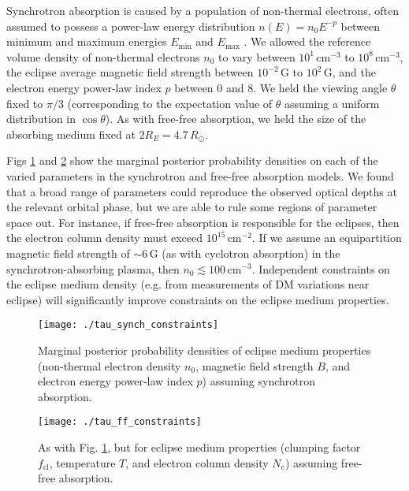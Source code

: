 \documentclass[fleqn,usenatbib]{mnras}
\begin{document}
Synchrotron absorption is caused by a population of non-thermal electrons, often assumed to possess a power-law energy distribution $n(E) = n_0 E^{-p}$ between minimum and maximum energies $E_\text{min}$ and $E_\text{max}$ \citep{1994ApJ...422..304T}. We allowed the reference volume density of non-thermal electrons $n_0$ to vary between $10^1\,\text{cm}^{-3}$ to $10^{8}\,\text{cm}^{-3}$, the eclipse average magnetic field strength between $10^{-2}$\,G to $10^2$\,G, and the electron energy power-law index $p$ between 0 and 8. We held the viewing angle $\theta$ fixed to $\pi/3$ (corresponding to the expectation value of $\theta$ assuming a uniform distribution in $\cos \theta$). As with free-free absorption, we held the size of the absorbing medium fixed at $2R_E = 4.7\,R_\odot$.

Figs \ref{fig:tau_synch} and \ref{fig:tau_ff} show the marginal posterior probability densities on each of the varied parameters in the synchrotron and free-free absorption models. We found that a broad range of parameters could reproduce the observed optical depths at the relevant orbital phase, but we are able to rule some regions of parameter space out. For instance, if free-free absorption is responsible for the eclipses, then the electron column density must exceed $10^{15}$\,cm$^{-2}$. If we assume an equipartition magnetic field strength of $\sim 6$\,G (as with cyclotron absorption) in the synchrotron-absorbing plasma, then $n_0 \lesssim 100$\,cm$^{-3}$. Independent constraints on the eclipse medium density (e.g. from measurements of DM variations near eclipse) will significantly improve constraints on the eclipse medium properties.

\begin{figure}
    \texttt{[image: ./tau\_synch\_constraints]}
    \caption{Marginal posterior probability densities of eclipse medium properties (non-thermal electron density $n_0$, magnetic field strength $B$, and electron energy power-law index $p$) assuming synchrotron absorption. \label{fig:tau_synch}}
\end{figure}

\begin{figure}
    \texttt{[image: ./tau\_ff\_constraints]}
    \caption{As with Fig. \ref{fig:tau_synch}, but for eclipse medium properties (clumping factor $f_{\mathrm{cl}}$, temperature $T$, and electron column density $N_e$) assuming free-free absorption. \label{fig:tau_ff}}
\end{figure}
\end{document}
